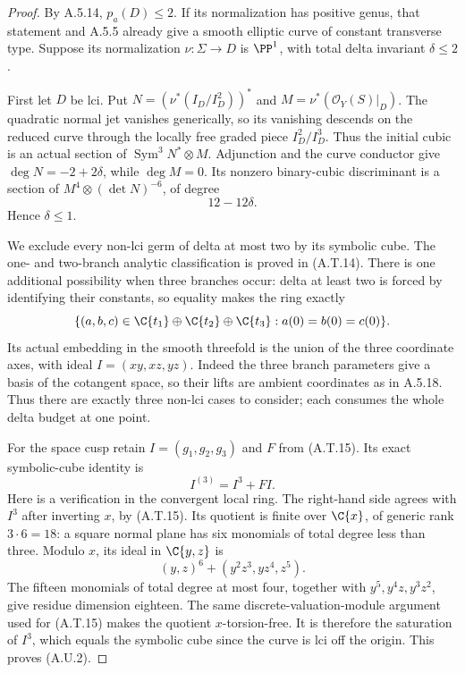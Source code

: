 \begin{proof}
By A.5.14, $p_a(D)\le2$. If its normalization has
positive genus, that statement and A.5.5 already give
a smooth elliptic curve of constant transverse type.
Suppose its normalization $\nu:\Sigma\to D$ is
$\PP^1$, with total delta invariant $\delta\le2$.

First let $D$ be lci. Put
$N=(\nu^*(I_D/I_D^2))^*$ and
$M=\nu^*(\mathcal O_Y(S)|_D)$.
The quadratic normal jet vanishes generically, so
its vanishing descends on the reduced curve through
the locally free graded piece $I_D^2/I_D^3$.
Thus the initial cubic is an actual section of
$\operatorname{Sym}^3N^*\otimes M$.
Adjunction and the curve conductor give
$\deg N=-2+2\delta$, while $\deg M=0$.
Its nonzero binary-cubic discriminant is a section
of $M^4\otimes(\det N)^{-6}$, of degree
\[
                         12-12\delta.             \tag{A.U.1}
\]
Hence $\delta\le1$.

We exclude every non-lci germ of delta at most two
by its symbolic cube. The one- and two-branch analytic
classification is proved in (A.T.14). There is one
additional possibility when three branches occur:
delta at least two is forced by identifying their
constants, so equality makes the ring exactly
\[
 \{(a,b,c)\in\C\{t_1\}\oplus\C\{t_2\}\oplus\C\{t_3\}:
                      a(0)=b(0)=c(0)\}.
\]
Its actual embedding in the smooth threefold is the
union of the three coordinate axes, with ideal
$I=(xy,xz,yz)$. Indeed the three branch parameters
give a basis of the cotangent space, so their lifts
are ambient coordinates as in A.5.18.
Thus there are exactly three non-lci cases to consider;
each consumes the whole delta budget at one point.

For the space cusp retain $I=(g_1,g_2,g_3)$ and
$F$ from (A.T.15). Its exact symbolic-cube identity is
\[
                         I^{(3)}=I^3+FI.           \tag{A.U.2}
\]
Here is a verification in the convergent local ring.
The right-hand side agrees with $I^3$ after inverting
$x$, by (A.T.15). Its quotient is finite over
$\C\{x\}$, of generic rank $3\cdot6=18$: a square
normal plane has six monomials of total degree less
than three. Modulo $x$, its ideal in $\C\{y,z\}$ is
\[
 (y,z)^6+(y^2z^3,yz^4,z^5).
\]
The fifteen monomials of total degree at most four,
together with $y^5,y^4z,y^3z^2$, give residue dimension
eighteen. The same discrete-valuation-module argument
used for (A.T.15) makes the quotient $x$-torsion-free.
It is therefore the saturation of $I^3$, which equals
the symbolic cube since the curve is lci off the origin.
This proves (A.U.2).


\end{proof}

